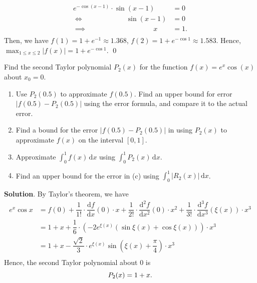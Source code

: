 \documentclass[11pt]{article}
\theoremstyle{break}
\newcommand{\dd}{\text{d}}
\newcommand{\ddi}{\text{$\,$d}}
\numberwithin{equation}{theorem}
\begin{document}
\begin{enumerate}
    \begin{align*}
        e^{-\cos(x-1)}\cdot\sin(x-1)&=0\\
        \iff\quad\quad\quad\quad\quad\quad\sin(x-1)&=0\\
        \implies\quad\quad\quad\quad\quad\quad\quad\quad\quad\ \  x&=1.\\[-3.4em]
    \end{align*}
    Then, we have $f(1)=1+e^{-1}\approx1.368$, $f(2)=1+e^{-\cos1}\approx1.583$. Hence, $\displaystyle\max_{1\leq x\leq 2}|f(x)|=1+e^{-\cos1}$. \qed
\end{enumerate}

\newpage
\begin{problem}\label{problem 3}
    Find the second Taylor polynomial $P_2(x)$ for the function $f(x)=e^x\cos(x)$ about $x_0=0$.
    \begin{enumerate}
        \item Use $P_2(0.5)$ to approximate $f(0.5)$. Find an upper bound for error $|f(0.5)-P_2(0.5)|$ using the error formula, and compare it to the actual error.
        \item Find a bound for the error $|f(0.5)-P_2(0.5)|$ in using $P_2(x)$ to approximate $f(x)$ on the interval $[0, 1]$.
        \item Approximate $\displaystyle\int_{0}^{1}f(x)\ddi x$ using $\displaystyle\int_{0}^{1}P_2(x)\ddi x$.
        \item Find an upper bound for the error in (c) using $\displaystyle\int_{0}^{1}|R_2(x)|\ddi x$.
    \end{enumerate}
\end{problem}
\textbf{Solution}. By Taylor's theorem, we have \vspace{-0.6em}
\begin{align*}
    e^x\cos x&=f(0)+\dfrac{1}{1!}\cdot\dfrac{\dd f}{\dd x}(0)\cdot x+\dfrac{1}{2!}\cdot\dfrac{\dd^2 f}{\dd x^2}(0)\cdot x^2+\dfrac{1}{3!}\cdot\dfrac{\dd^3 f}{\dd x^3}(\xi(x))\cdot x^3\\
    &=1+x+\dfrac{1}{6}\cdot\left(-2e^{\xi(x)}\left(\sin \xi(x)+\cos \xi(x)\right) \right) \cdot x^3\\
    &=1+x-\dfrac{\sqrt{2}}{3}\cdot e^{\xi(x)}\sin\left(\xi(x)+\dfrac{\pi}{4}\right) \cdot x^3\\[-3.4em]
\end{align*}
Hence, the second Taylor polynomial about $0$ is \vspace{-0.6em}
\begin{equation*}
    P_2(x)=1+x. \vspace{-0.6em}
\end{equation*}
\end{document}
